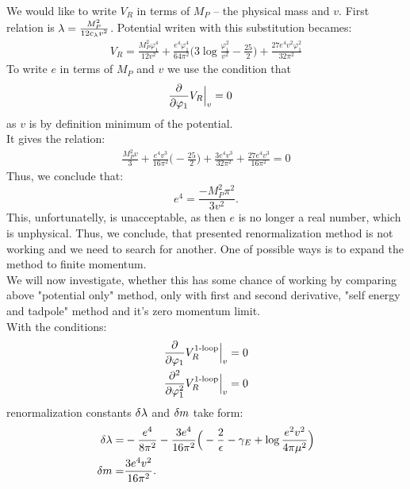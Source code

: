 We would like to write $V_R$ in terms of $M_P$ -- the physical mass and $v$.
First relation is $\lambda = \frac{M_P^2}{12c_\lambda v^2}$. Potential writen with this substitution 
becames:
\begin{align}
V_R = \frac{M_P^2\varphi_1^4}{12v^2} + \frac{e^4\varphi_1^4}{64\pi^2}\Big(3\log
\frac{\varphi_1^2}{v^2}- 
\frac{25}{2}\Big)+
\frac{27e^4v^2\varphi_1^2}{32\pi^2}
\end{align}
To write $e$ in terms of $M_P$ and $v$ we use the condition that 
\begin{align}
\frac{\partial }{\partial \varphi_1}V_R\Big|_{v} &= 0 
\end{align}
as $v$ is by definition minimum of the potential. \\
It gives the relation:
\begin{align}
\frac{M_P^2v}{3}+\frac{e^4v^3}{16\pi^2}\Big(-\frac{25}{2}\Big)+\frac{3e^4v^3}{32\pi^2}+
\frac{27e^4v^3}{16\pi^2} = 0
\end{align}
Thus, we conclude that: 
\begin{equation}
e^4=\frac{-M_P^2\pi^2}{3v^2}.
\end{equation}
This, unfortunatelly, is unacceptable, as then $e$ is no longer a real number, which is 
unphysical.
Thus, we conclude, that presented renormalization method is not working and we need to search for 
another. One of possible ways is to expand the method to finite momentum. \\
We will now investigate, whether this has some chance of working by comparing 
above "potential only" method, only with first and second derivative, "self energy and tadpole" 
method and it's zero momentum limit. \\
With the conditions:
\begin{align}
\frac{\partial }{\partial \varphi_1}V_R^{\textrm{1-loop}}\Big|_{v} &= 0 \\
\frac{\partial^2 }{\partial \varphi_1^2}V_R^{\textrm{1-loop}}\Big|_{v} &= 0
\end{align}
renormalization constants $\delta\lambda$ and $\delta m$ take form:
\begin{align}
\delta\lambda =& -\frac{e^4}{8\pi^2}-\frac{3e^4}{16\pi^2}\Big(-\frac{2}{\epsilon}-\gamma_E+\log{
\frac{e^2v^2}{4\pi\mu^2}}\Big)\\
\delta m =& \frac{3e^4v^2}{16\pi^2}.
\end{align}

